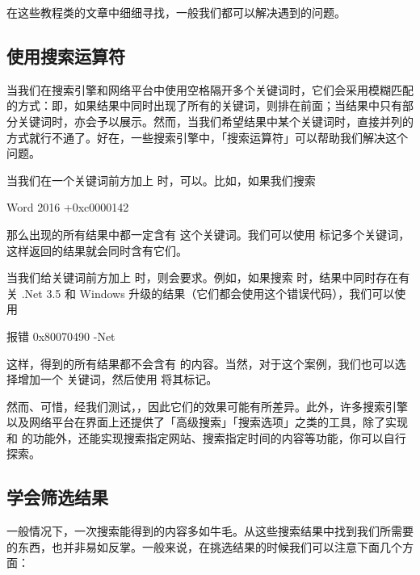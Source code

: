 在这些教程类的文章中细细寻找，一般我们都可以解决遇到的问题。

\subsection{使用搜索运算符}

当我们在搜索引擎和网络平台中使用空格隔开多个关键词时，它们会采用模糊匹配的方式：即，如果结果中同时出现了所有的关键词，则排在前面；当结果中只有部分关键词时，亦会予以展示。然而，当我们希望结果中某个关键词时，直接并列的方式就行不通了。好在，一些搜索引擎中，「搜索运算符」可以帮助我们解决这个问题。

当我们在一个关键词前方加上 \MissingVerb{+} 时，可以。比如，如果我们搜索

\begin{quoting}
  Word 2016 +0xc0000142
\end{quoting}

那么出现的所有结果中都一定含有  这个关键词。我们可以使用 \MissingVerb{+} 标记多个关键词，这样返回的结果就会同时含有它们。

当我们给关键词前方加上 \MissingVerb{-} 时，则会要求。例如，如果搜索  时，结果中同时存在有关 .Net 3.5 和 Windows 升级的结果（它们都会使用这个错误代码），我们可以使用

\begin{quoting}
  报错 0x80070490 -Net
\end{quoting}

这样，得到的所有结果都不会含有  的内容。当然，对于这个案例，我们也可以选择增加一个  关键词，然后使用 \MissingVerb{+} 将其标记。

然而、可惜，经我们测试，，因此它们的效果可能有所差异。此外，许多搜索引擎以及网络平台在界面上还提供了「高级搜索」「搜索选项」之类的工具，除了实现 \MissingVerb{+} 和 \MissingVerb{-} 的功能外，还能实现搜索指定网站、搜索指定时间的内容等功能，你可以自行探索。

\subsection{学会筛选结果}

一般情况下，一次搜索能得到的内容多如牛毛。从这些搜索结果中找到我们所需要的东西，也并非易如反掌。一般来说，在挑选结果的时候我们可以注意下面几个方面：

